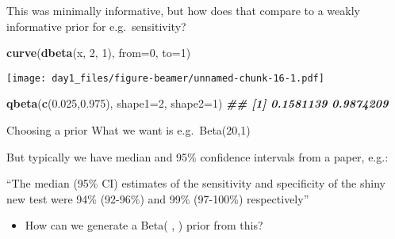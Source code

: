 \documentclass[
  ignorenonframetext,
]{beamer}
\newenvironment{Shaded}{\begin{snugshade}}{\end{snugshade}}
\newcommand{\AttributeTok}[1]{\textcolor[rgb]{0.13,0.29,0.53}{#1}}
\newcommand{\DecValTok}[1]{\textcolor[rgb]{0.00,0.00,0.81}{#1}}
\newcommand{\DocumentationTok}[1]{\textcolor[rgb]{0.56,0.35,0.01}{\textbf{\textit{#1}}}}
\newcommand{\FloatTok}[1]{\textcolor[rgb]{0.00,0.00,0.81}{#1}}
\newcommand{\FunctionTok}[1]{\textcolor[rgb]{0.13,0.29,0.53}{\textbf{#1}}}
\newcommand{\NormalTok}[1]{#1}
\providecommand{\tightlist}{%
  \setlength{\itemsep}{0pt}\setlength{\parskip}{0pt}}
\begin{document}
\begin{frame}[fragile]
This was minimally informative, but how does that compare to a weakly
informative prior for e.g.~sensitivity?

\scriptsize

\begin{Shaded}
\begin{Highlighting}[]
\FunctionTok{curve}\NormalTok{(}\FunctionTok{dbeta}\NormalTok{(x, }\DecValTok{2}\NormalTok{, }\DecValTok{1}\NormalTok{), }\AttributeTok{from=}\DecValTok{0}\NormalTok{, }\AttributeTok{to=}\DecValTok{1}\NormalTok{)}
\end{Highlighting}
\end{Shaded}

\texttt{[image: day1\_files/figure-beamer/unnamed-chunk-16-1.pdf]}

\begin{Shaded}
\begin{Highlighting}[]
\FunctionTok{qbeta}\NormalTok{(}\FunctionTok{c}\NormalTok{(}\FloatTok{0.025}\NormalTok{,}\FloatTok{0.975}\NormalTok{), }\AttributeTok{shape1=}\DecValTok{2}\NormalTok{, }\AttributeTok{shape2=}\DecValTok{1}\NormalTok{)}
\DocumentationTok{\#\# [1] 0.1581139 0.9874209}
\end{Highlighting}
\end{Shaded}

\normalsize
\end{frame}

\begin{frame}
\begin{block}{Choosing a prior}
\protect\hypertarget{choosing-a-prior}{}
What we want is e.g.~Beta(20,1)

But typically we have median and 95\% confidence intervals from a paper,
e.g.:

``The median (95\% CI) estimates of the sensitivity and specificity of
the shiny new test were 94\% (92-96\%) and 99\% (97-100\%)
respectively''

\begin{itemize}
\tightlist
\item
  How can we generate a Beta( , ) prior from this?
\end{itemize}
\end{block}
\end{frame}
\end{document}
